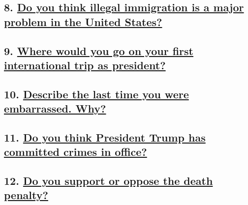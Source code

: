 \hypertarget{8-do-you-think-illegal-immigration-is-a-major-problem-in-the-united-states}{%
\subsection{\texorpdfstring{8.
\href{https://www.nytimes.com/interactive/2019/us/politics/immigration-democratic-candidates.html}{Do
you think illegal immigration is a major problem in the United
States?}}{8. Do you think illegal immigration is a major problem in the United States?}}\label{8-do-you-think-illegal-immigration-is-a-major-problem-in-the-united-states}}

\hypertarget{9-where-would-you-go-on-your-first-international-trip-as-president}{%
\subsection{\texorpdfstring{9.
\href{https://www.nytimes.com/interactive/2019/us/politics/international-trip-democratic-candidates.html}{Where
would you go on your first international trip as
president?}}{9. Where would you go on your first international trip as president?}}\label{9-where-would-you-go-on-your-first-international-trip-as-president}}

\hypertarget{10-describe-the-last-time-you-were-embarrassed-why}{%
\subsection{\texorpdfstring{10.
\href{https://www.nytimes.com/interactive/2019/us/politics/embarrassment-democratic-candidates.html}{Describe
the last time you were embarrassed.
Why?}}{10. Describe the last time you were embarrassed. Why?}}\label{10-describe-the-last-time-you-were-embarrassed-why}}

\hypertarget{11-do-you-think-president-trump-has-committed-crimes-in-office}{%
\subsection{\texorpdfstring{11.
\href{https://www.nytimes.com/interactive/2019/us/politics/trump-crimes-democratic-candidates.html}{Do
you think President Trump has committed crimes in
office?}}{11. Do you think President Trump has committed crimes in office?}}\label{11-do-you-think-president-trump-has-committed-crimes-in-office}}

\hypertarget{12-do-you-support-or-oppose-the-death-penalty}{%
\subsection{\texorpdfstring{12.
\href{https://www.nytimes.com/interactive/2019/us/politics/death-penalty-democratic-candidates.html}{Do
you support or oppose the death
penalty?}}{12. Do you support or oppose the death penalty?}}\label{12-do-you-support-or-oppose-the-death-penalty}}

